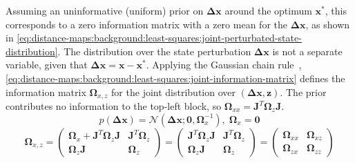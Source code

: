 Assuming an uninformative (uniform) prior on $\mathbf{\Delta x}$ around the
optimum $\mathbf{x}^*$, this corresponds to a zero information matrix with
a zero mean for the $\mathbf{\Delta x}$, as shown in
\eqref{eq:distance-maps:background:least-squares:joint-perturbated-state-distribution}.
The distribution over the state perturbation $\mathbf{\Delta x}$ is not
a separate variable, given that $\mathbf{\Delta x} = \mathbf{x} - \mathbf{x}^*$.
Applying the Gaussian chain rule~\cite{barfoot:book:2017},
\eqref{eq:distance-maps:background:least-squares:joint-information-matrix}
defines the information matrix $\mathbf{\Omega}_{x,z}$
for the joint distribution over
$(\mathbf{\Delta x}, \mathbf{z})$.
The prior contributes no information to the top-left block, so
$\mathbf{\Omega}_{xx} = \mathbf{J}^T \mathbf{\Omega}_z \mathbf{J}$.
\begin{equation}
\label{eq:distance-maps:background:least-squares:joint-perturbated-state-distribution}
p(\mathbf{\Delta x}) = \mathcal{N}\!\left(\mathbf{\Delta x};\mathbf{0},\mathbf{\Omega}_{x}^{-1}\right),
\; \mathbf{\Omega}_{x} = \mathbf{0}
\end{equation}
\begin{equation}
\label{eq:distance-maps:background:least-squares:joint-information-matrix}
\mathbf{\Omega}_{x,z} =
\begin{pmatrix}
  \mathbf{\Omega}_{x} + \mathbf{J}^T \mathbf{\Omega}_{z} \mathbf{J} &
  \mathbf{J}^{T}\mathbf{\Omega}_{z}\\
  \mathbf{\Omega}_{z}\mathbf{J} &
  \mathbf{\Omega}_{z}
\end{pmatrix} =
\begin{pmatrix}
  \mathbf{J}^T \mathbf{\Omega}_{z} \mathbf{J} &
  \mathbf{J}^{T}\mathbf{\Omega}_{z}\\
  \mathbf{\Omega}_{z}\mathbf{J} &
  \mathbf{\Omega}_{z}
\end{pmatrix} =
\begin{pmatrix}
  \mathbf{\Omega}_{xx} & \mathbf{\Omega}_{xz} \\
  \mathbf{\Omega}_{zx} & \mathbf{\Omega}_{zz}
\end{pmatrix}
\end{equation}

